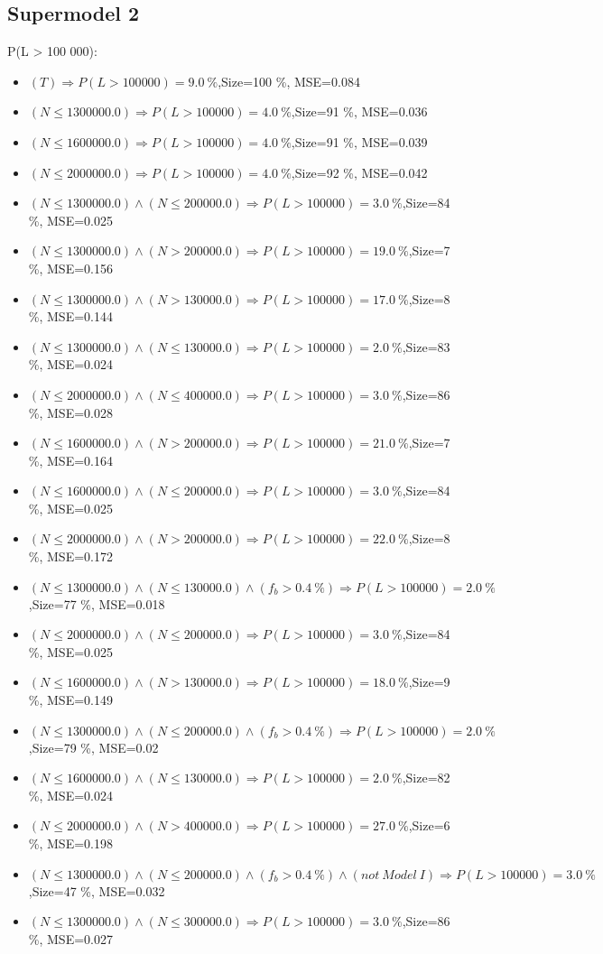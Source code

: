 \documentclass[numbered]{CSL}
\begin{document}
\subsection{Supermodel 2}
P(L > 100 000):
\begin{itemize}
\item $(T) \Rightarrow P(L > 100 000) = 9.0~\%$,\hfill Size=100 \%, MSE=0.084
\item $(N \leq 1300000.0) \Rightarrow P(L > 100 000) = 4.0~\%$,\hfill Size=91 \%, MSE=0.036
\item $(N \leq 1600000.0) \Rightarrow P(L > 100 000) = 4.0~\%$,\hfill Size=91 \%, MSE=0.039
\item $(N \leq 2000000.0) \Rightarrow P(L > 100 000) = 4.0~\%$,\hfill Size=92 \%, MSE=0.042
\item $(N \leq 1300000.0) \land (N \leq 200000.0) \Rightarrow P(L > 100 000) = 3.0~\%$,\hfill Size=84 \%, MSE=0.025
\item $(N \leq 1300000.0) \land (N > 200000.0) \Rightarrow P(L > 100 000) = 19.0~\%$,\hfill Size=7 \%, MSE=0.156
\item $(N \leq 1300000.0) \land (N > 130000.0) \Rightarrow P(L > 100 000) = 17.0~\%$,\hfill Size=8 \%, MSE=0.144
\item $(N \leq 1300000.0) \land (N \leq 130000.0) \Rightarrow P(L > 100 000) = 2.0~\%$,\hfill Size=83 \%, MSE=0.024
\item $(N \leq 2000000.0) \land (N \leq 400000.0) \Rightarrow P(L > 100 000) = 3.0~\%$,\hfill Size=86 \%, MSE=0.028
\item $(N \leq 1600000.0) \land (N > 200000.0) \Rightarrow P(L > 100 000) = 21.0~\%$,\hfill Size=7 \%, MSE=0.164
\item $(N \leq 1600000.0) \land (N \leq 200000.0) \Rightarrow P(L > 100 000) = 3.0~\%$,\hfill Size=84 \%, MSE=0.025
\item $(N \leq 2000000.0) \land (N > 200000.0) \Rightarrow P(L > 100 000) = 22.0~\%$,\hfill Size=8 \%, MSE=0.172
\item $(N \leq 1300000.0) \land (N \leq 130000.0) \land (f_b > 0.4~\%) \Rightarrow P(L > 100 000) = 2.0~\%$,\hfill Size=77 \%, MSE=0.018
\item $(N \leq 2000000.0) \land (N \leq 200000.0) \Rightarrow P(L > 100 000) = 3.0~\%$,\hfill Size=84 \%, MSE=0.025
\item $(N \leq 1600000.0) \land (N > 130000.0) \Rightarrow P(L > 100 000) = 18.0~\%$,\hfill Size=9 \%, MSE=0.149
\item $(N \leq 1300000.0) \land (N \leq 200000.0) \land (f_b > 0.4~\%) \Rightarrow P(L > 100 000) = 2.0~\%$,\hfill Size=79 \%, MSE=0.02
\item $(N \leq 1600000.0) \land (N \leq 130000.0) \Rightarrow P(L > 100 000) = 2.0~\%$,\hfill Size=82 \%, MSE=0.024
\item $(N \leq 2000000.0) \land (N > 400000.0) \Rightarrow P(L > 100 000) = 27.0~\%$,\hfill Size=6 \%, MSE=0.198
\item $(N \leq 1300000.0) \land (N \leq 200000.0) \land (f_b > 0.4~\%) \land (not~Model~I) \Rightarrow P(L > 100 000) = 3.0~\%$,\hfill Size=47 \%, MSE=0.032
\item $(N \leq 1300000.0) \land (N \leq 300000.0) \Rightarrow P(L > 100 000) = 3.0~\%$,\hfill Size=86 \%, MSE=0.027
\end{itemize}
\end{document}
